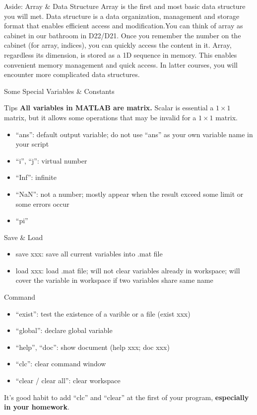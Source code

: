 \begin{frame}
\begin{block}{Aside: Array \& Data Structure}
Array is the first and most basic data structure you will met. Data structure is a data organization, management and storage format that enables efficient access and modification.\footnotemark You can think of array as cabinet in our bathroom in D22/D21. Once you remember the number on the cabinet (for array, indices), you can quickly access the content in it. Array, regardless its dimension, is stored as a 1D sequence in memory. This enables convenient memory management and quick access. In latter courses, you will encounter more complicated data structures. 
\end{block}
\end{frame}


\begin{frame}{Some Special Variables \& Constants}
\begin{block}{Tips}
\textbf{All variables in MATLAB are matrix.} Scalar is essential a $1\times1$ matrix, but it allows some operations that may be invalid for a $1\times1$ matrix.
\end{block}
\begin{itemize}
\item ``ans'': default output variable; do not use ``ans'' as your own variable name in your script
\item ``i'', ``j'': virtual number
\item ``Inf'': infinite
\item ``NaN'': not a number; mostly appear when the result exceed some limit or some errors occur
\item ``pi''
\end{itemize}

\begin{block}{Save \& Load}
\begin{itemize}
\item save xxx: save all current variables into .mat file
\item load xxx: load .mat file; will not clear variables already in workspace; will cover the variable in workspace if two variables share same name
\end{itemize}
\end{block}
\end{frame}

\begin{frame}{Command}
\begin{itemize}
\item ``exist'': test the existence of a varible or a file (exist xxx)
\item ``global'': declare global variable
\item ``help'', ``doc'': show document (help xxx; doc xxx)
\item ``clc'': clear command window
\item ``clear / clear all'': clear workspace
\end{itemize}
It's good habit to add ``clc'' and ``clear'' at the first of your program, \textbf{especially in your homework}.
\end{frame}

